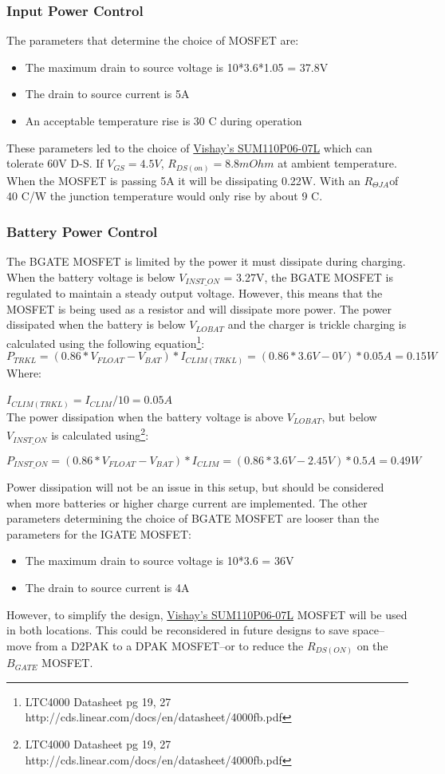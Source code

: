 \documentclass{article}
\begin{document}
\subsubsection{Input Power Control}
The parameters that determine the choice of MOSFET are: 
\begin{itemize}
\item The maximum drain to source voltage is 10*3.6*1.05 = 37.8V
\item The drain to source current is 5A
\item An acceptable temperature rise is 30 C during operation
\end{itemize}
These parameters led to the choice of \href{http://www.vishay.com/docs/72439/72439.pdf}{Vishay's SUM110P06-07L} which can tolerate 60V D-S. If $V_{GS} = 4.5V$, $R_{DS(on)} = 8.8mOhm$ at ambient temperature. When the MOSFET is passing 5A it will be dissipating 0.22W. With an $R_{\Theta JA}$of 40 C/W the junction temperature would only rise by about 9 C.

\subsubsection{Battery Power Control}
The BGATE MOSFET is limited by the power it must dissipate during charging. When the battery voltage is below $V_{INST\_ON}$ = 3.27V, the BGATE MOSFET is regulated to maintain a steady output voltage. However, this means that the MOSFET is being used as a resistor and will dissipate more power. The power dissipated when the battery is below $V_{LOBAT}$ and the charger is trickle charging is calculated using the following equation\footnote{LTC4000 Datasheet pg 19, 27 http://cds.linear.com/docs/en/datasheet/4000fb.pdf}:
\[P_{TRKL} = (0.86*V_{FLOAT} - V_{BAT})*I_{CLIM(TRKL)} = (0.86*3.6V - 0V)*0.05A = 0.15W\]
Where:

$I_{CLIM(TRKL)} = I_{CLIM}/10 = 0.05A$\\

The power dissipation when the battery voltage is above $V_{LOBAT}$, but below $V_{INST\_ON}$ is calculated using\footnote{LTC4000 Datasheet pg 19, 27 http://cds.linear.com/docs/en/datasheet/4000fb.pdf}:

\[P_{INST\_ON} = (0.86*V_{FLOAT} - V_{BAT})*I_{CLIM}= (0.86*3.6V - 2.45V)*0.5A = 0.49W\]

Power dissipation will not be an issue in this setup, but should be considered when more batteries or higher charge current are implemented. The other parameters determining the choice of BGATE MOSFET are looser than the parameters for the IGATE MOSFET:
\begin{itemize}
\item The maximum drain to source voltage is 10*3.6 = 36V
\item The drain to source current is 4A
\end{itemize}
However, to simplify the design, \href{http://www.vishay.com/docs/72439/72439.pdf}{Vishay's SUM110P06-07L} MOSFET will be used in both locations. This could be reconsidered in future designs to save space--move from a D2PAK to a DPAK MOSFET--or to reduce the $R_{DS(ON)}$ on the $B_{GATE}$ MOSFET.
\end{document}
